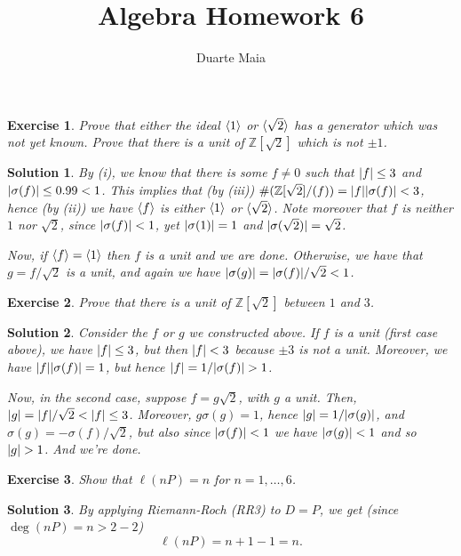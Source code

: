 \documentclass{article}
\title{Algebra Homework 6}
\author{Duarte Maia}
\newtheorem{ex}{Exercise}
\theoremstyle{nonumberplain}
\newtheorem{sol}{Solution}
\newcommand{\Z}{\mathbb{Z}}
\DeclarePairedDelimiter{\abs}{\lvert}{\rvert}
\DeclarePairedDelimiter{\braket}{\langle}{\rangle}
\begin{document}
\maketitle

\setcounter{ex}{35}

\begin{ex}
Prove that either the ideal $\braket 1$ or $\braket{\sqrt2}$ has a generator which was not yet known. Prove that there is a unit of $\Z[\sqrt2]$ which is not $\pm 1$.
\end{ex}

\begin{sol}
By (i), we know that there is some $f \neq 0$ such that $\abs f \leq 3$ and $\abs{\sigma(f)} \leq 0.99 < 1$. This implies that (by (iii)) $\#(\Z[\sqrt2]/(f)) = \abs f \abs{\sigma(f)} < 3$, hence (by (ii)) we have $\braket f$ is either $\braket 1$ or $\braket{\sqrt 2}$. Note moreover that $f$ is neither $1$ nor $\sqrt 2$, since $\abs{\sigma(f)} < 1$, yet $\abs{\sigma(1)} = 1$ and $\abs{\sigma(\sqrt2)} = \sqrt2$.

Now, if $\braket f = \braket 1$ then $f$ is a unit and we are done. Otherwise, we have that $g = f/\sqrt2$ is a unit, and again we have $\abs{\sigma(g)} = \abs{\sigma(f)}/\sqrt2 < 1$.
\end{sol}

\begin{ex}
Prove that there is a unit of $\Z[\sqrt2]$ between $1$ and $3$.
\end{ex}

\begin{sol}
Consider the $f$ or $g$ we constructed above. If $f$ is a unit (first case above), we have $\abs f \leq 3$, but then $\abs f < 3$ because $\pm 3$ is not a unit. Moreover, we have $\abs f \abs{\sigma(f)} = 1$, but hence $\abs f = 1/\abs{\sigma(f)} > 1$.

Now, in the second case, suppose $f = g \sqrt2$, with $g$ a unit. Then, $\abs g = \abs f /\sqrt2 < \abs f \leq 3$. Moreover, $g \sigma(g) = 1$, hence $\abs g = 1/\abs{\sigma(g)}$, and $\sigma(g) = - \sigma(f) / \sqrt2$, but also since $\abs{\sigma(f)} < 1$ we have $\abs{\sigma(g)}<1$ and so $\abs g > 1$. And we're done.
\end{sol}

\begin{ex}
Show that $\ell(nP) = n$ for $n = 1, \dots, 6$.
\end{ex}

\begin{sol}
By applying Riemann-Roch (RR3) to $D = P$, we get (since $\deg(nP) = n > 2 - 2$)
\begin{equation}
\ell(nP) = n + 1 - 1 = n.
\end{equation} 
\end{sol}
\end{document}
